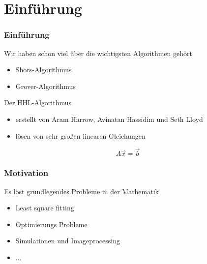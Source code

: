 \section{Einführung}


    \begin{frame}
        \frametitle{Einführung}

        Wir haben schon viel über die wichtigsten Algorithmen gehört
        \begin{itemize}
            \item  Shors-Algorithmus
            \item  Grover-Algorithmus
        \end{itemize}

        \hfill

        Der HHL-Algorithmus
        \begin{itemize}
            \item  erstellt von Aram Harrow, Avinatan Hassidim und Seth Lloyd 
            \item  lösen von sehr großen linearen Gleichungen 
        \end{itemize}

        $$ A \vec{x} = \vec{b} $$

    \end{frame}



    \begin{frame}
        \frametitle{Motivation}

        Es löst grundlegendes Probleme in der Mathematik
        \begin{itemize}
            \item   Least square fitting 
            \item   Optimierungs Probleme
            \item   Simulationen und Imageprocessing
            \item   ...
       \end{itemize}

        \hfil

    \end{frame}

